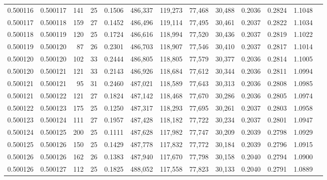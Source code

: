 \begin{tabular}{rrrrrrrrrrrrr}
0.500116 & 0.500117 & 141 &  25 &                                     0.1506 & 486,337 & 119,273 &  77,468 &  30,488 & 0.2036 & 0.2824 & 1.1048 \\
0.500117 & 0.500118 & 159 &  27 &                                     0.1452 & 486,496 & 119,114 &  77,495 &  30,461 & 0.2037 & 0.2822 & 1.1034 \\
0.500118 & 0.500119 & 120 &  25 &                                     0.1724 & 486,616 & 118,994 &  77,520 &  30,436 & 0.2037 & 0.2819 & 1.1022 \\
0.500119 & 0.500120 &  87 &  26 &                                     0.2301 & 486,703 & 118,907 &  77,546 &  30,410 & 0.2037 & 0.2817 & 1.1014 \\
0.500120 & 0.500120 & 102 &  33 &                                     0.2444 & 486,805 & 118,805 &  77,579 &  30,377 & 0.2036 & 0.2814 & 1.1005 \\
0.500120 & 0.500121 & 121 &  33 &                                     0.2143 & 486,926 & 118,684 &  77,612 &  30,344 & 0.2036 & 0.2811 & 1.0994 \\
0.500121 & 0.500121 &  95 &  31 &                                     0.2460 & 487,021 & 118,589 &  77,643 &  30,313 & 0.2036 & 0.2808 & 1.0985 \\
0.500121 & 0.500122 & 121 &  27 &                                     0.1824 & 487,142 & 118,468 &  77,670 &  30,286 & 0.2036 & 0.2805 & 1.0974 \\
0.500122 & 0.500123 & 175 &  25 &                                     0.1250 & 487,317 & 118,293 &  77,695 &  30,261 & 0.2037 & 0.2803 & 1.0958 \\
0.500123 & 0.500124 & 111 &  27 &                                     0.1957 & 487,428 & 118,182 &  77,722 &  30,234 & 0.2037 & 0.2801 & 1.0947 \\
0.500124 & 0.500125 & 200 &  25 &                                     0.1111 & 487,628 & 117,982 &  77,747 &  30,209 & 0.2039 & 0.2798 & 1.0929 \\
0.500125 & 0.500126 & 150 &  25 &                                     0.1429 & 487,778 & 117,832 &  77,772 &  30,184 & 0.2039 & 0.2796 & 1.0915 \\
0.500126 & 0.500126 & 162 &  26 &                                     0.1383 & 487,940 & 117,670 &  77,798 &  30,158 & 0.2040 & 0.2794 & 1.0900 \\
0.500126 & 0.500127 & 112 &  25 &                                     0.1825 & 488,052 & 117,558 &  77,823 &  30,133 & 0.2040 & 0.2791 & 1.0889 \\

\end{tabular}
